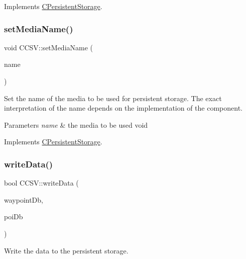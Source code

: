 Implements \hyperlink{classCPersistentStorage_a28edf547e10449a7f45de9885b68890b}{C\+Persistent\+Storage}.

\mbox{\label{classCCSV_a473f20a4cb83f3f50174a194121138d1}} 
\subsubsection{\texorpdfstring{set\+Media\+Name()}{setMediaName()}}
{\footnotesize\ttfamily void C\+C\+S\+V\+::set\+Media\+Name (\begin{DoxyParamCaption}\item[{std\+::string}]{name }\end{DoxyParamCaption})\hspace{0.3cm}{\ttfamily [virtual]}}

Set the name of the media to be used for persistent storage. The exact interpretation of the name depends on the implementation of the component.


\begin{DoxyParams}{Parameters}
{\em name} & the media to be used  void \\
\hline
\end{DoxyParams}


Implements \hyperlink{classCPersistentStorage_af626d001915346c04c2008c9ea8bb8d8}{C\+Persistent\+Storage}.

\mbox{\label{classCCSV_a9f0f855c4337078ab3ccff7a3a8148fa}} 
\subsubsection{\texorpdfstring{write\+Data()}{writeData()}}
{\footnotesize\ttfamily bool C\+C\+S\+V\+::write\+Data (\begin{DoxyParamCaption}\item[{const \hyperlink{classCWpDatabase}{C\+Wp\+Database} \&}]{waypoint\+Db,  }\item[{const \hyperlink{classCPoiDatabase}{C\+Poi\+Database} \&}]{poi\+Db }\end{DoxyParamCaption})\hspace{0.3cm}{\ttfamily [virtual]}}

Write the data to the persistent storage.


